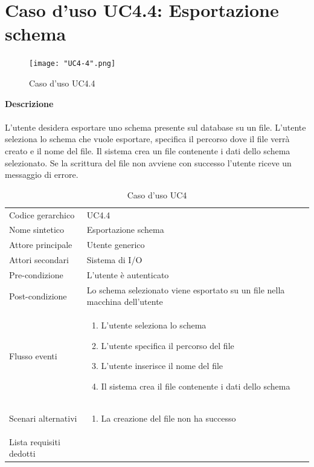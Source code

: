 \documentclass[a4paper]{report}
\begin{document}
	 \section{Caso d'uso UC4.4: Esportazione schema}
	 	\begin{figure}[H]
			\centering
			\texttt{[image: "UC4-4".png]}
			\caption{Caso d'uso UC4.4}
		\end{figure}
	 \textbf{Descrizione} \\ \\
	 L'utente desidera esportare uno schema presente sul database su un file. L'utente seleziona lo schema
	 che vuole esportare, specifica il percorso dove il file verrà creato e il nome del file. Il sistema crea un
	 file contenente i dati dello schema selezionato. Se la scrittura del file non avviene con successo l'utente
	 riceve un messaggio di errore.
		\begin{table}[H]
		\begin{tabularx}{\textwidth}{X | X}\toprule
			\rowcolor{orange!65}Codice gerarchico & UC4.4 \\
			Nome sintetico & Esportazione schema \\
			\rowcolor{orange!65}Attore principale & Utente generico\\
			Attori secondari & Sistema di I/O \\
			\rowcolor{orange!65}Pre-condizione & L'utente è autenticato\\
			Post-condizione & Lo schema selezionato viene esportato su un file nella macchina dell'utente \\
			\rowcolor{orange!65}Flusso eventi & \begin{enumerate}
			\item L'utente seleziona lo schema
			\item L'utente specifica il percorso del file
			\item L'utente inserisce il nome del file
			\item Il sistema crea il file contenente i dati dello schema
			\end{enumerate} \\
			Scenari alternativi & \begin{enumerate}
			\item La creazione del file non ha successo
			\end{enumerate} \\
			\rowcolor{orange!65}Lista requisiti dedotti & \\
			\bottomrule
		\end{tabularx}
		\caption{Caso d'uso UC4}
	 \end{table}
\end{document}

